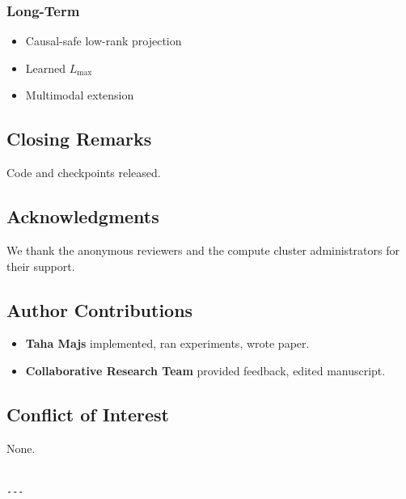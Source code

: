 \subsubsection{Long-Term}
\begin{itemize}
\item Causal-safe low-rank projection
\item Learned $L_\text{max}$
\item Multimodal extension

\end{itemize}
\subsection{Closing Remarks}

Code and checkpoints released.

\subsection{Acknowledgments}

We thank the anonymous reviewers and the compute cluster administrators for their support.

\subsection{Author Contributions}

\begin{itemize}
\item \textbf{Taha Majs} implemented, ran experiments, wrote paper.
\item \textbf{Collaborative Research Team} provided feedback, edited manuscript.

\end{itemize}
\subsection{Conflict of Interest}

None.
\begin{lstlisting}

---
\end{lstlisting}